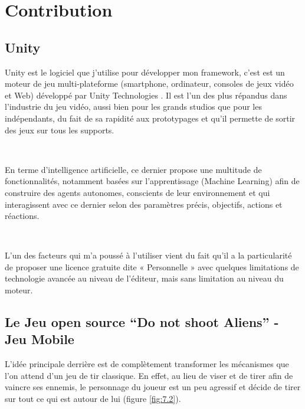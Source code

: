 
\chapter{Contribution} %

\label{Chapter6} %


\section{Unity}

Unity est le logiciel que j'utilise pour développer mon framework, c’est est un moteur de jeu multi-plateforme (smartphone, ordinateur, consoles de jeux vidéo et Web) développé par Unity Technologies \parencite{unity1}. Il est l'un des plus répandus dans l'industrie du jeu vidéo, aussi bien pour les grands studios que pour les indépendants, du fait de sa rapidité aux prototypages et qu'il permette de sortir des jeux sur tous les supports.


~\par
En terme d’intelligence artificielle, ce dernier propose une multitude de fonctionnalités, notamment basées sur l’apprentissage (Machine Learning) afin de construire des agents autonomes, conscients de leur environnement et qui interagissent avec ce dernier selon des paramètres précis, objectifs, actions et réactions.

~\par
L’un des facteurs qui m’a poussé à l’utiliser vient du fait qu'il a la particularité de proposer une licence gratuite dite « Personnelle » avec quelques limitations de technologie avancée au niveau de l'éditeur, mais sans limitation au niveau du moteur.  



\section{Le Jeu open source “Do not shoot Aliens” - Jeu Mobile}

L'idée principale derrière est de complètement transformer les mécanismes que l’on attend d'un jeu de tir classique. En effet, au lieu de viser et de tirer afin de vaincre ses ennemis, le personnage du joueur est un peu agressif et décide de tirer sur tout ce qui est autour de lui (figure \ref{fig:7.2}). 

